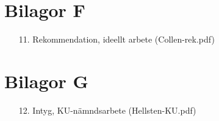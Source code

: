 \documentclass[a4paper]{article}
\begin{document}
\section*{\textsf{Bilagor F}}

\begin{enumerate}
\item [11.] Rekommendation, ideellt arbete (Collen-rek.pdf)
\end{enumerate}

\section*{\textsf{Bilagor G}}

\begin{enumerate}
\item [12.] Intyg, KU-nämndsarbete (Hellsten-KU.pdf)
\end{enumerate}
\end{document}

